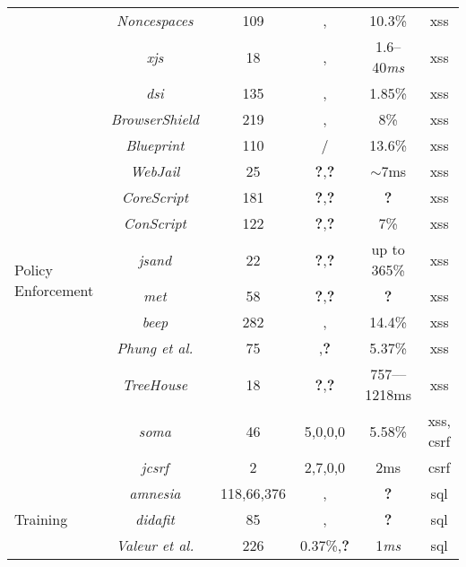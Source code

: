 \documentclass[conference]{IEEEtran}
\newcommand{\tick}{\ding{52}}
\newcommand{\xmark}{\ding{56}}
\begin{document}
\begin{table*}
\begin{threeparttable}
\begin{small}
{\begin{tabular}{l|c|c|cc|c}
	&  {\it Noncespaces}~\cite{GC09} & 109 & \tick,\tick &  10.3\% & {\sc xss} \\ 
    &  {\it x{\sc js}}~\cite{APKLM10} & 18 & \tick,\tick & 1.6--40{\it ms} & {\sc xss} \\
	\hline
	\hline    
	\multirow{13}{*}{Policy Enforcement}
	&  {\it {\sc dsi}}~\cite{NSS06} & 135 & \xmark,\xmark & 1.85\% & {\sc xss} \\ 
	&  {\it BrowserShield}~\cite{RDWDE07} & 219 & \tick,\tick & 8\% & {\sc xss} \\ 
	&  {\it Blueprint}~\cite{LV09} & 110 & \tick/\tick & 13.6\% & {\sc xss} \\ 
	&  {\it WebJail}~\cite{VDDPJ11} & 25 & {\bf ?},{\bf ?} & $\sim$7ms & {\sc xss} \\ 
	&  {\it CoreScript}~\cite{YCIS07} & 181 & {\bf ?},{\bf ?} &  {\bf ?} & {\sc xss} \\ 
	&  {\it ConScript}~\cite{ML10} & 122 & {\bf ?},{\bf ?} & 7\% & {\sc xss} \\
	&  {\it {\sc js}and}~\cite{AVBPDP12} & 22 & {\bf ?},{\bf ?} & up to 365\% & {\sc xss}\\
	&  {\it {\sc met}}~\cite{ELX07} & 58 & {\bf ?},{\bf ?} &  {\bf ?} & {\sc xss} \\ 
    &  {\it {\sc beep}}~\cite{TNH07} & 282 & \tick,\tick & 14.4\% & {\sc xss} \\
    &  {\it Phung et al.}~\cite{PSC09} & 75 & \xmark,{\bf ?} & 5.37\% & {\sc xss} \\
    &  {\it TreeHouse}~\cite{IW12} & 18 & {\bf ?},{\bf ?} & 757–--1218ms & {\sc xss} \\
    & {\it {\sc soma}}~\cite{OWVS08} & 46 & 5,0,0,0 & 5.58\% & {\sc xss}, {\sc csrf}\\
    & {\it j{\sc csrf}}~\cite{PS11} & 2 & 2,7,0,0 & 2ms & {\sc csrf} \\
	\hline
	\hline  
        \multirow{12}{*}{Training}
	&   {\it {\sc amnesia}}~\cite{HO05,HO06,HO05b} & 118,66,376 & \tick,\tick & {\bf ?} & {\sc sql} \\ 
	&   {\it {\sc didafit}}~\cite{LLW02} & 85 & \xmark,\xmark & {\bf ?} & {\sc sql} \\
	&   {\it Valeur et al.}~\cite{VMV05} & 226 & 0.37\%,{\bf ?} & 1{\it ms} & {\sc sql} \\

\end{tabular}}
\end{small}
\end{threeparttable}
\end{table*}
\end{document}
